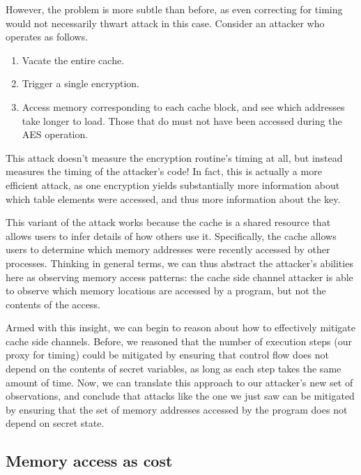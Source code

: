 \documentclass[11pt,twoside]{scrartcl}
\begin{document}
However, the problem is more subtle than before, as even correcting for timing would not necessarily thwart attack in this case. Consider an attacker who operates as follows.
\begin{enumerate}
\item Vacate the entire cache.
\item Trigger a single encryption.
\item Access memory corresponding to each cache block, and see which addresses take longer to load. Those that do must not have been accessed during the AES operation.
\end{enumerate}
This attack doesn't measure the encryption routine's timing at all, but instead measures the timing of the attacker's code! In fact, this is actually a more efficient attack, as one encryption yields substantially more information about which table elements were accessed, and thus more information about the key.

This variant of the attack works because the cache is a shared resource that allows users to infer details of how others use it. Specifically, the cache allows users to determine which memory addresses were recently accessed by other processes. Thinking in general terms, we can thus abstract the attacker's abilities here as observing memory access patterns: the cache side channel attacker is able to observe which memory locations are accessed by a program, but not the contents of the access.

Armed with this insight, we can begin to reason about how to effectively mitigate cache side channels. Before, we reasoned that the number of execution steps (our proxy for timing) could be mitigated by ensuring that control flow does not depend on the contents of secret variables, as long as each step takes the same amount of time. Now, we can translate this approach to our attacker's new set of observations, and conclude that attacks like the one we just saw can be mitigated by ensuring that the set of memory addresses accessed by the program does not depend on secret state.

\subsection{Memory access as cost}
\end{document}
